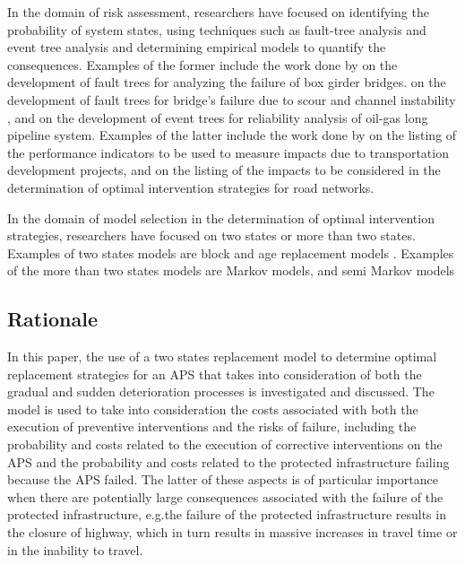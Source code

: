 \documentclass[]{article}
\begin{document}
In the domain of risk assessment, researchers have focused on identifying
the probability of system states, using techniques such as fault-tree
analysis and event tree analysis and determining empirical models
to quantify the consequences. Examples of the former include the work
done by \citet{Davis-McDaniel2013} on the development of fault trees
for analyzing the failure of box girder bridges. \citet{Johnson1999}
on the development of fault trees for bridge's failure due to scour
and channel instability , and \citet{Tian2012} on the development
of event trees for reliability analysis of oil-gas long pipeline system.
Examples of the latter include the work done by \citet{Talvitie1999,OECD1997}
on the listing of the performance indicators to be used to measure
impacts due to transportation development projects, and \citet{Adey2012}
on the listing of the impacts to be considered in the determination
of optimal intervention strategies for road networks. 

In the domain of model selection in the determination of optimal intervention
strategies, researchers have focused on two states or more than two
states. Examples of two states models are block and age replacement
models \citep{Lethanh2013a,Adey2014a,Chen1992,Hong2006a}. Examples
of the more than two states models are Markov models, and semi Markov
models \citep{Madanat1994,Robelin2007,Chen2004,Thomas2013}

\subsection{Rationale}

In this paper, the use of a two states replacement model to determine
optimal replacement strategies for an APS that takes into consideration
of both the gradual and sudden deterioration processes is investigated
and discussed. The model is used to take into consideration the costs
associated with both the execution of preventive interventions and
the risks of failure, including the probability and costs related
to the execution of corrective interventions on the APS and the probability
and costs related to the protected infrastructure failing because
the APS failed. The latter of these aspects is of particular importance
when there are potentially large consequences associated with the
failure of the protected infrastructure, e.g.the failure of the protected
infrastructure results in the closure of highway, which in turn results
in massive increases in travel time or in the inability to travel. 
\end{document}
